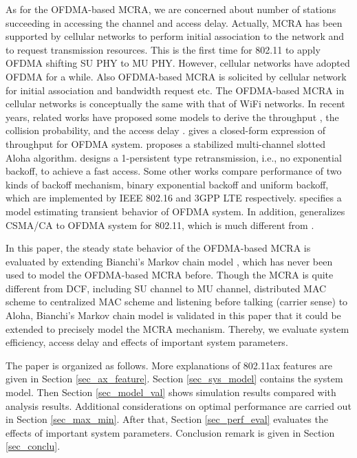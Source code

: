 \documentclass[journal]{IEEEtran}
\begin{document}
As for the OFDMA-based MCRA, we are concerned about number of stations succeeding in accessing the channel and access delay.
Actually, MCRA has been supported by cellular networks to perform initial association to the network and to request transmission resources.
This is the first time for 802.11 to apply OFDMA shifting SU PHY to MU PHY.
However, cellular networks have adopted OFDMA for a while. 
Also OFDMA-based MCRA is solicited by cellular network for initial association and bandwidth request etc.
The OFDMA-based MCRA in cellular networks is conceptually the same with that of WiFi networks. 
In recent years, related works have proposed some models to derive the throughput \cite{zhou2008efficient}\cite{shen2003performance}\cite{choi2006multichannel}, the collision probability\cite{kim2012performance}\cite{seo2011design}, and the access delay \cite{zhou2008efficient}\cite{kim2012performance}\cite{seo2011design}\cite{behroozi1992delay}. 
\cite{zhou2008efficient} gives a closed-form expression of throughput for OFDMA system. 
\cite{shen2003performance} proposes a stabilized multi-channel slotted Aloha algorithm.
\cite{choi2006multichannel} designs a 1-persistent type retransmission, i.e., no exponential backoff, to achieve a fast access.
Some other works \cite{zhou2008efficient}\cite{seo2011design}\cite{kim2012performance} compare performance of two kinds of backoff mechanism, binary exponential backoff and uniform backoff, which are implemented by IEEE 802.16 and 3GPP LTE respectively.  
\cite{wei2015modeling} specifies a model estimating transient behavior of OFDMA system.
In addition, \cite{GeneralizedOFDMACSMACA} generalizes CSMA/CA to OFDMA system for 802.11, which is much different from \cite{draft_ax}.


In this paper, the steady state behavior of the OFDMA-based MCRA is evaluated by extending Bianchi's Markov chain model \cite{bianchi2000performance}, which has never been used to model the OFDMA-based MCRA before. 
Though the MCRA is quite different from DCF, including SU channel to MU channel, distributed MAC scheme to centralized MAC scheme and listening before talking (carrier sense) to Aloha, Bianchi's Markov chain model is validated in this paper that it could be extended to precisely model the MCRA mechanism.
Thereby, we evaluate system efficiency, access delay and effects of important system parameters. 

The paper is organized as follows.
More explanations of 802.11ax features are given in Section \ref{sec_ax_feature}.
Section \ref{sec_sys_model} contains the system model. 
Then Section \ref{sec_model_val} shows simulation results compared with analysis results.
Additional considerations on optimal performance are carried out in Section \ref{sec_max_min}. 
After that, Section \ref{sec_perf_eval} evaluates the effects of important system parameters. 
Conclusion remark is given in Section \ref{sec_conclu}.
\end{document}

